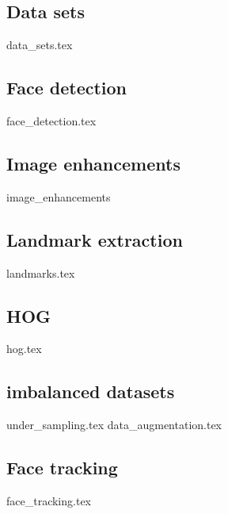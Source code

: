 \subsection{Data sets}
{data_sets.tex}

\subsection{Face detection}
{face_detection.tex}

\subsection{Image enhancements}
{image_enhancements}

\subsection{Landmark extraction}
{landmarks.tex}

\subsection{HOG}
{hog.tex}

\subsection{imbalanced datasets}
{under_sampling.tex}
{data_augmentation.tex}

\subsection{Face tracking}
{face_tracking.tex}